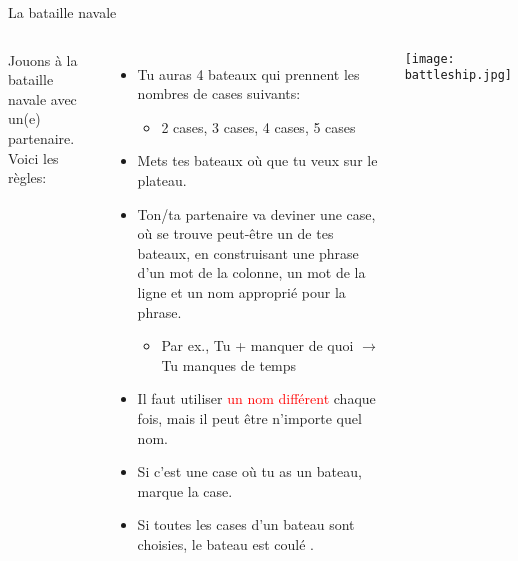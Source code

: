 \begin{frame}{La bataille navale}
  \scriptsize
    \begin{columns}
        Jouons à la bataille navale avec un(e) partenaire.
        Voici les règles:
        \begin{itemize}
          \item Tu auras 4 bateaux qui prennent les nombres de cases  suivants:
          \begin{itemize}
            \scriptsize
            \item 2 cases, 3 cases, 4 cases, 5 cases
          \end{itemize}
          \item Mets tes bateaux où que  tu veux sur le plateau.
          \item Ton/ta partenaire va deviner une case, où se trouve peut-être un de tes bateaux, en construisant une phrase d'un mot de la colonne, un mot de la ligne \alert{et un nom approprié pour la phrase}.
          \begin{itemize}
            \scriptsize
            \item Par ex., Tu + manquer de quoi $\to$ Tu manques de temps
          \end{itemize}
          \item Il faut utiliser \textcolor{red}{un nom différent} chaque fois, mais il peut être n'importe quel nom.
          \item Si c'est une case où tu as un bateau, marque la case.
          \item Si toutes les cases d'un bateau sont choisies, le bateau est coulé .
          \end{itemize}
        \texttt{[image: battleship.jpg]}
    \end{columns}
\end{frame}
